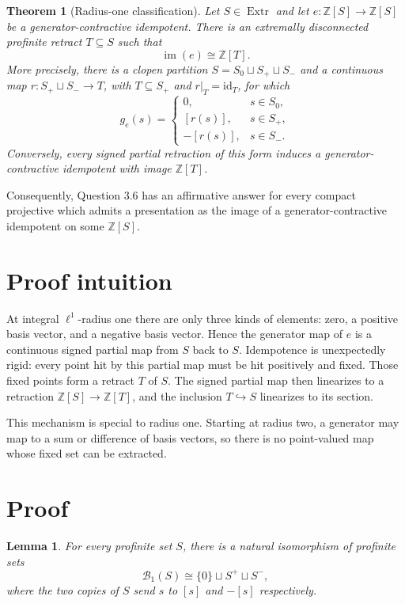 \documentclass[11pt]{article}
\newtheorem{theorem}{Theorem}
\newtheorem{lemma}{Lemma}
\newcommand{\Z}{\mathbb Z}
\newcommand{\Extr}{\operatorname{Extr}}
\newcommand{\im}{\operatorname{im}}
\newcommand{\Ball}{\mathcal B}
\begin{document}
\begin{theorem}[Radius-one classification]\label{thm:main}
Let $S\in\Extr$ and let $e:\Z[S]\to\Z[S]$ be a
generator-contractive idempotent.  There is an extremally disconnected
profinite retract $T\subseteq S$ such that
\[
 \im(e)\cong \Z[T].
\]
More precisely, there is a clopen partition
$S=S_0\sqcup S_+\sqcup S_-$ and a continuous map
$r:S_+\sqcup S_-\to T$, with $T\subseteq S_+$ and $r|_T=\mathrm{id}_T$,
for which
\[
 g_e(s)=
 \begin{cases}
 0,&s\in S_0,\\
 [r(s)],&s\in S_+,\\
 -[r(s)],&s\in S_-.
 \end{cases}
\]
Conversely, every signed partial retraction of this form induces a
generator-contractive idempotent with image $\Z[T]$.
\end{theorem}

Consequently, Question 3.6 has an affirmative answer for every compact
projective which admits a presentation as the image of a
generator-contractive idempotent on some $\Z[S]$.

\section{Proof intuition}

At integral $\ell^1$-radius one there are only three kinds of elements: zero,
a positive basis vector, and a negative basis vector.  Hence the generator
map of $e$ is a continuous signed partial map from $S$ back to $S$.
Idempotence is unexpectedly rigid: every point hit by this partial map must
be hit positively and fixed.  Those fixed points form a retract $T$ of $S$.
The signed partial map then linearizes to a retraction $\Z[S]\to\Z[T]$, and
the inclusion $T\hookrightarrow S$ linearizes to its section.

This mechanism is special to radius one.  Starting at radius two, a generator
may map to a sum or difference of basis vectors, so there is no point-valued
map whose fixed set can be extracted.

\section{Proof}

\begin{lemma}\label{lem:ball}
For every profinite set $S$, there is a natural isomorphism of profinite sets
\[
 \Ball_1(S)\cong \{0\}\sqcup S^+\sqcup S^-,
\]
where the two copies of $S$ send $s$ to $[s]$ and $-[s]$ respectively.
\end{lemma}
\end{document}
